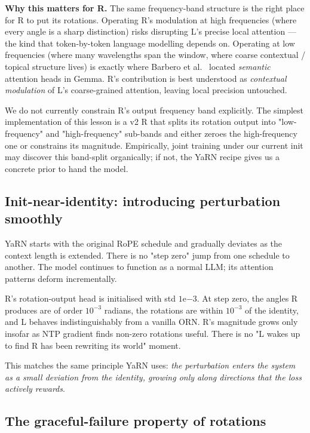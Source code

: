 \documentclass[10pt, twocolumn, a4paper]{article}
\begin{document}
\textbf{Why this matters for R.} The same frequency-band structure is the right place for R to put its rotations. Operating R's modulation at high frequencies (where every angle is a sharp distinction) risks disrupting L's precise local attention --- the kind that token-by-token language modelling depends on. Operating at low frequencies (where many wavelengths span the window, where coarse contextual / topical structure lives) is exactly where Barbero et al.~\cite{barbero2025round} located \emph{semantic} attention heads in Gemma. R's contribution is best understood as \emph{contextual modulation} of L's coarse-grained attention, leaving local precision untouched.

We do not currently constrain R's output frequency band explicitly. The simplest implementation of this lesson is a v2 R that splits its rotation output into "low-frequency" and "high-frequency" sub-bands and either zeroes the high-frequency one or constrains its magnitude. Empirically, joint training under our current init may discover this band-split organically; if not, the YaRN recipe gives us a concrete prior to hand the model.

\subsection*{Init-near-identity: introducing perturbation smoothly}

YaRN starts with the original RoPE schedule and gradually deviates as the context length is extended. There is no "step zero" jump from one schedule to another. The model continues to function as a normal LLM; its attention patterns deform incrementally.

R's rotation-output head is initialised with std $1\mathrm{e}{-3}$. At step zero, the angles R produces are of order $10^{-3}$ radians, the rotations are within $10^{-3}$ of the identity, and L behaves indistinguishably from a vanilla ORN. R's magnitude grows only insofar as NTP gradient finds non-zero rotations useful. There is no "L wakes up to find R has been rewriting its world" moment.

This matches the same principle YaRN uses: \emph{the perturbation enters the system as a small deviation from the identity, growing only along directions that the loss actively rewards}.

\subsection*{The graceful-failure property of rotations}
\end{document}
